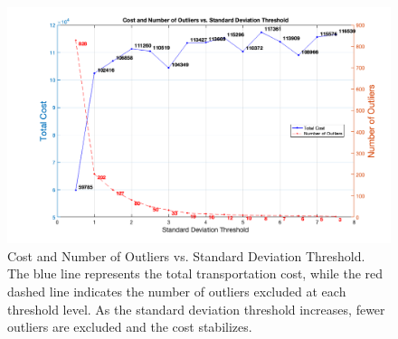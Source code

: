 \begin{figure}[!htbp]
\centering
\includegraphics[width=\textwidth]{img/KNN_distance_outlier_cost}
\caption{Cost and Number of Outliers vs. Standard Deviation Threshold. The blue line represents the total transportation cost, while the red dashed line indicates the number of outliers excluded at each threshold level. As the standard deviation threshold increases, fewer outliers are excluded and the cost stabilizes.}
\label{fig:outlier_cost}
\end{figure}




